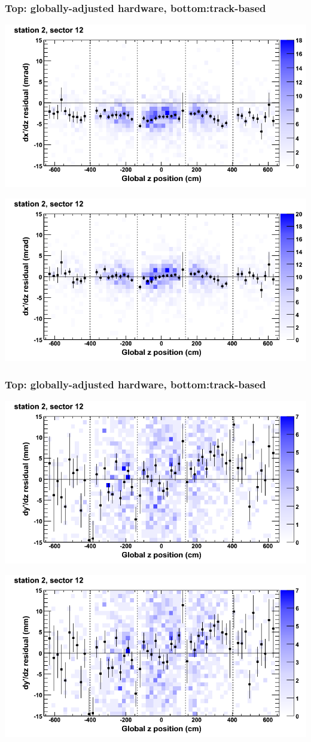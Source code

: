 \documentclass[compress]{beamer}
\begin{document}
\begin{frame}
\frametitle{Top: globally-adjusted hardware, bottom:track-based}
\includegraphics[width=0.7\linewidth]{NOV4_mapplots_HW/DTvsz_st2sec12_dxdz.png}

\includegraphics[width=0.7\linewidth]{NOV4_mapplots/DTvsz_st2sec12_dxdz.png}
\end{frame}

\begin{frame}
\frametitle{Top: globally-adjusted hardware, bottom:track-based}
\includegraphics[width=0.7\linewidth]{NOV4_mapplots_HW/DTvsz_st2sec12_dydz.png}

\includegraphics[width=0.7\linewidth]{NOV4_mapplots/DTvsz_st2sec12_dydz.png}
\end{frame}
\end{document}
